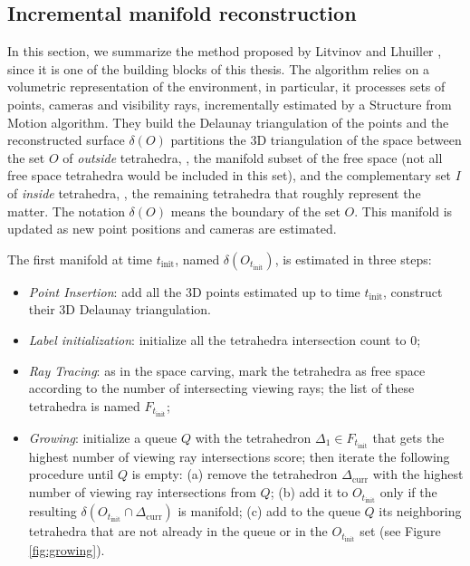 \subsection{Incremental manifold reconstruction}
\label{subsec:incrementalManifold_2}
In this section, we summarize the method proposed  by Litvinov and Lhuiller \cite{litvinov_lhuillier_13,litvinov_Lhiuller14}, since it is one of the building blocks of this thesis.
The algorithm relies on a volumetric representation of the environment, in particular, it processes sets of points, cameras and visibility rays,  incrementally estimated by a Structure from Motion algorithm. 
They build the Delaunay triangulation of the points and the reconstructed surface $\delta( O)$ partitions  the 3D triangulation of the space between the set $O$ of \emph{outside} tetrahedra, \ie, the manifold subset of the free space (not all free space tetrahedra would be included in this set), and the complementary set $I$ of \emph{inside} tetrahedra, \ie, the remaining tetrahedra that roughly represent the matter. The notation $\delta( O)$ means the boundary  of the set $O$.
This manifold is updated as new point positions and cameras are estimated. 

The first manifold at time $t_{\text{init}}$,  named $\delta( O_{t_{\text{init}}})$, is estimated in three steps:
\begin{itemize}
  \item \emph{Point Insertion}: add all the 3D points estimated up to time $t_{\text{init}}$, construct their 3D Delaunay triangulation.
  \item \emph{Label initialization}: initialize all the tetrahedra intersection count to $0$;
  \item \emph{Ray Tracing}: as in the space carving, mark the tetrahedra as free space according to the number of intersecting viewing rays; the list of these tetrahedra is named $F_{t_{\text{init}}}$;
  \item \emph{Growing}: initialize a queue $Q$ with the tetrahedron $\Delta_1 \in F_{t_{\text{init}}}$ that gets the highest number of viewing ray intersections score; then iterate the following procedure until $Q$ is empty: (a) remove the tetrahedron $\Delta_{\text{curr}}$ with the highest number of viewing ray intersections from $Q$; (b) add it to $O_{t_{\text{init}}}$ only if the resulting $\delta (O_{t_{\text{init}}} \cap \Delta_{\text{curr}})$  is manifold; (c) add to the queue $Q$ its neighboring tetrahedra that are not already in the queue or in the $O_{t_{\text{init}}}$ set (see Figure \ref{fig:growing}). 
\end{itemize}



